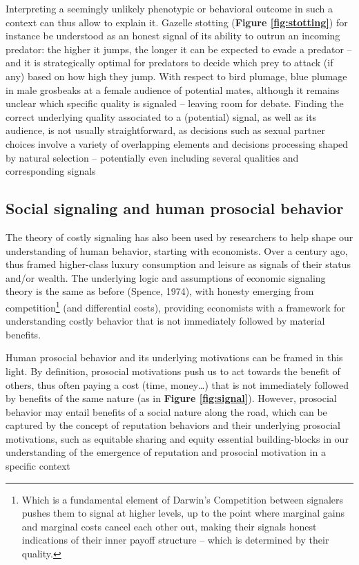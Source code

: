 \documentclass[a4paper,12pt]{report}
\begin{document}
Interpreting a seemingly unlikely phenotypic or behavioral outcome in such a context
can thus allow to explain it. Gazelle stotting (\textbf{Figure \ref{fig:stotting}})
for instance be understood
as an honest signal of its ability to outrun an incoming predator:
the higher it jumps, the longer it can be expected to evade a predator –
and it is strategically optimal for predators to decide which prey to attack
(if any) based on how high they jump. With respect to bird plumage, blue plumage
in male grosbeaks %
at a female audience of potential mates, although it remains unclear which specific quality
is signaled – leaving room for debate. Finding the correct underlying quality associated
to a (potential) signal, as well as its audience, is not usually straightforward,
as decisions such as sexual partner choices involve a variety of overlapping elements
and decisions processing shaped by natural selection – potentially even including
several qualities and corresponding signals %


\subsection{Social signaling and human prosocial behavior}
\label{s:sgl_h}
The theory of costly signaling has also been used by researchers to help shape our
understanding of human behavior, starting with economists. Over a century ago, 
thus framed higher-class luxury consumption and leisure as signals of their status 
and/or wealth. The underlying logic and assumptions of economic signaling theory is 
the same as before (Spence, 1974), with honesty emerging from competition\footnote{
    Which is a fundamental element of Darwin’s 
    Competition between signalers pushes them to signal at higher levels, up to the point where
    marginal gains and marginal costs cancel each other out, making their 
    signals honest indications of their inner payoff structure – which is determined by their
    quality.}
(and differential costs), providing economists with a framework 
for understanding costly behavior that is not immediately followed by material benefits.

Human prosocial behavior and its underlying motivations can be framed in this light. 
By definition, prosocial motivations push us to act towards the benefit of others, 
thus often paying a cost (time, money…) that is not immediately followed by benefits 
of the same nature (as in \textbf{Figure \ref{fig:signal}}).
However, prosocial behavior may entail benefits of a social 
nature along the road, which can be captured by the concept of reputation 
behaviors and their underlying prosocial motivations, such as equitable sharing 
and equity %
essential building-blocks in our understanding of the emergence of reputation 
and prosocial motivation in a specific context 
\end{document}
